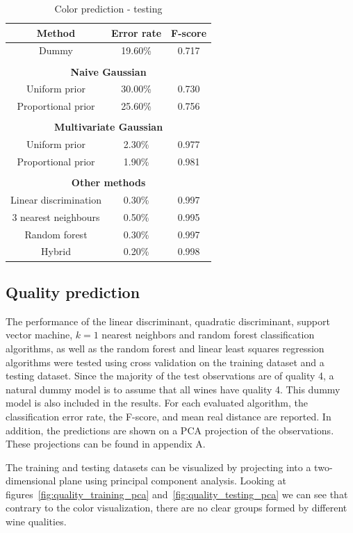\documentclass[twoside]{article}
\begin{document}
\begin{multicols}{2}
\begin{table}[H]
\caption{Color prediction - testing}
\label{table:color_testing}
\begin{tabular}{ccc}
\textbf{Method} & \textbf{Error rate} & \textbf{F-score}\\
\midrule
Dummy & 19.60\% & 0.717 \\
\\
\multicolumn{3}{c}{\textbf{Naive Gaussian}} \\
Uniform prior & 30.00\% & 0.730 \\
Proportional prior & 25.60\% & 0.756 \\
\\
\multicolumn{3}{c}{\textbf{Multivariate Gaussian}} \\
Uniform prior & 2.30\% & 0.977 \\
Proportional prior & 1.90\% & 0.981 \\
\\
\multicolumn{3}{c}{\textbf{Other methods}} \\
Linear discrimination & 0.30\% & 0.997 \\
$3$ nearest neighbours & 0.50\% & 0.995 \\
Random forest & 0.30\% & 0.997 \\
Hybrid & 0.20\% & 0.998 \\

\end{tabular}
\end{table}

\subsection{Quality prediction}

The performance of the linear discriminant, quadratic discriminant, support vector machine, $k=1$ nearest neighbors and random forest
classification algorithms, as well as the random forest and linear least squares regression algorithms were tested using cross validation 
on the training dataset and a testing dataset.
Since the majority of the test observations are of quality 4, a natural dummy model is to assume that all wines have quality 4.
This dummy model is also included in the results.
For each evaluated algorithm, the classification error rate, the F-score, and mean real distance are reported. In addition, the predictions are shown on a PCA projection
of the observations. These projections can be found in appendix A.

The training and testing datasets can be visualized by projecting into a two-dimensional plane using principal component analysis. Looking at
figures~\ref{fig:quality_training_pca} and~\ref{fig:quality_testing_pca} we can see that contrary to the color visualization, there are no clear groups
formed by different wine qualities.


\end{multicols}
\end{document}
